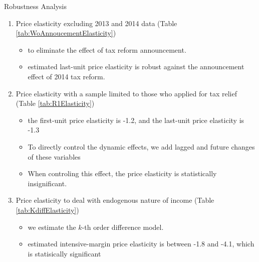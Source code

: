\documentclass[
  ignorenonframetext,
  aspectratio=169,
]{beamer}
\providecommand{\tightlist}{%
  \setlength{\itemsep}{0pt}\setlength{\parskip}{0pt}}
\begin{document}
\begin{frame}{Robustness Analysis}
\protect\hypertarget{robustness-analysis}{}
\begin{enumerate}
\tightlist
\item
  Price elasticity excluding 2013 and 2014 data (Table \ref{tab:WoAnnoucementElasticity})

  \begin{itemize}
  \tightlist
  \item
    to eliminate the effect of tax reform announcement.
  \item
    estimated last-unit price elasticity is robust against the announcement effect of 2014 tax reform.
  \end{itemize}
\item
  Price elasticity with a sample limited to those who applied for tax relief (Table \ref{tab:R1Elasticity})

  \begin{itemize}
  \tightlist
  \item
    the first-unit price elasticity is -1.2, and the last-unit price elasticity is -1.3
  \item
    To directly control the dynamic effects, we add lagged and future changes of these variables
  \item
    When controling this effect, the price elasticity is statistically insignificant.
  \end{itemize}
\item
  Price elasticity to deal with endogenous nature of income (Table \ref{tab:KdiffElasticity})

  \begin{itemize}
  \tightlist
  \item
    we estimate the \(k\)-th order difference model.
  \item
    estimated intensive-margin price elasticity is between -1.8 and -4.1, which is statisically significant
  \end{itemize}
\end{enumerate}
\end{frame}
\end{document}
